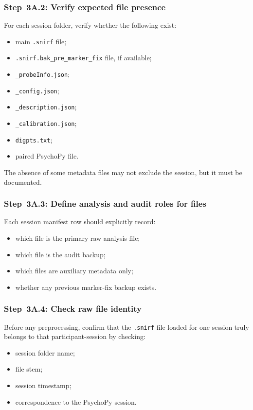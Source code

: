 \documentclass[11pt]{article}
\begin{document}
\subsubsection{Step~3A.2: Verify expected file presence}
For each session folder, verify whether the following exist:
\begin{itemize}
    \item main \texttt{.snirf} file;
    \item \texttt{.snirf.bak\_pre\_marker\_fix} file, if available;
    \item \texttt{\_probeInfo.json};
    \item \texttt{\_config.json};
    \item \texttt{\_description.json};
    \item \texttt{\_calibration.json};
    \item \texttt{digpts.txt};
    \item paired PsychoPy file.
\end{itemize}

The absence of some metadata files may not exclude the session, but it must be documented.

\subsubsection{Step~3A.3: Define analysis and audit roles for files}
Each session manifest row should explicitly record:
\begin{itemize}
    \item which file is the primary raw analysis file;
    \item which file is the audit backup;
    \item which files are auxiliary metadata only;
    \item whether any previous marker-fix backup exists.
\end{itemize}

\subsubsection{Step~3A.4: Check raw file identity}
Before any preprocessing, confirm that the \texttt{.snirf} file loaded for one session truly belongs
to that participant-session by checking:
\begin{itemize}
    \item session folder name;
    \item file stem;
    \item session timestamp;
    \item correspondence to the PsychoPy session.
\end{itemize}
\end{document}
